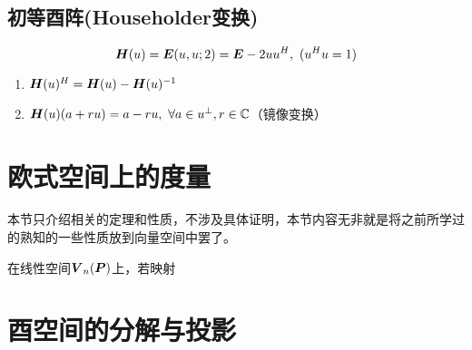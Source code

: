 \documentclass[12pt, a4paper, oneside, UTF8]{ctexbook}
\begin{document}
\subsection{初等酉阵(Householder变换)}
\begin{defn}{}{}
    \[\H(u)=\bs{E}(u,u;2)=\bs{E}-2uu^H,\ (u^Hu=1)\]
    \begin{enumerate}
        \item $\boldsymbol{H}(u)^H=\boldsymbol{H}(u)-\boldsymbol{H}(u)^{-1}$
        \item $\boldsymbol{H}(u)(a+ru)=a-ru,\ \forall a\in u^{\perp}, r\in\mathbb{C}$（镜像变换）
    \end{enumerate}
\end{defn}
\section{欧式空间上的度量}
本节只介绍相关的定理和性质，不涉及具体证明，本节内容无非就是将之前所学过的熟知的一些性质放到向量空间中罢了。
\begin{defn}{}{}
    在线性空间$\boldsymbol{V}_n(\boldsymbol{P})$上，若映射
\end{defn}
\section{酉空间的分解与投影}
\ifx\allfiles\undefined
\end{document}
